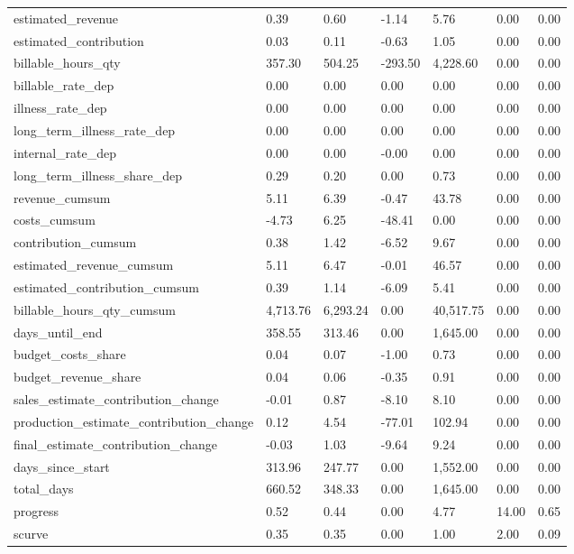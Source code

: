 \begin{landscape}
\begin{longtable}[h!]{lllllll}
estimated_revenue & 0.39 & 0.60 & -1.14 & 5.76 & 0.00 & 0.00 \\
estimated_contribution & 0.03 & 0.11 & -0.63 & 1.05 & 0.00 & 0.00 \\
billable_hours_qty & 357.30 & 504.25 & -293.50 & 4,228.60 & 0.00 & 0.00 \\
billable_rate_dep & 0.00 & 0.00 & 0.00 & 0.00 & 0.00 & 0.00 \\
illness_rate_dep & 0.00 & 0.00 & 0.00 & 0.00 & 0.00 & 0.00 \\
long_term_illness_rate_dep & 0.00 & 0.00 & 0.00 & 0.00 & 0.00 & 0.00 \\
internal_rate_dep & 0.00 & 0.00 & -0.00 & 0.00 & 0.00 & 0.00 \\
long_term_illness_share_dep & 0.29 & 0.20 & 0.00 & 0.73 & 0.00 & 0.00 \\
revenue_cumsum & 5.11 & 6.39 & -0.47 & 43.78 & 0.00 & 0.00 \\
costs_cumsum & -4.73 & 6.25 & -48.41 & 0.00 & 0.00 & 0.00 \\
contribution_cumsum & 0.38 & 1.42 & -6.52 & 9.67 & 0.00 & 0.00 \\
estimated_revenue_cumsum & 5.11 & 6.47 & -0.01 & 46.57 & 0.00 & 0.00 \\
estimated_contribution_cumsum & 0.39 & 1.14 & -6.09 & 5.41 & 0.00 & 0.00 \\
billable_hours_qty_cumsum & 4,713.76 & 6,293.24 & 0.00 & 40,517.75 & 0.00 & 0.00 \\
days_until_end & 358.55 & 313.46 & 0.00 & 1,645.00 & 0.00 & 0.00 \\
budget_costs_share & 0.04 & 0.07 & -1.00 & 0.73 & 0.00 & 0.00 \\
budget_revenue_share & 0.04 & 0.06 & -0.35 & 0.91 & 0.00 & 0.00 \\
sales_estimate_contribution_change & -0.01 & 0.87 & -8.10 & 8.10 & 0.00 & 0.00 \\
production_estimate_contribution_change & 0.12 & 4.54 & -77.01 & 102.94 & 0.00 & 0.00 \\
final_estimate_contribution_change & -0.03 & 1.03 & -9.64 & 9.24 & 0.00 & 0.00 \\
days_since_start & 313.96 & 247.77 & 0.00 & 1,552.00 & 0.00 & 0.00 \\
total_days & 660.52 & 348.33 & 0.00 & 1,645.00 & 0.00 & 0.00 \\
progress & 0.52 & 0.44 & 0.00 & 4.77 & 14.00 & 0.65 \\
scurve & 0.35 & 0.35 & 0.00 & 1.00 & 2.00 & 0.09 \\

\end{longtable}
\end{landscape}
